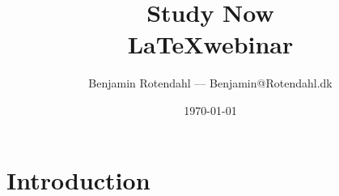 \documentclass{article}
\title{
  \vspace{13em}
  \large{Study Now} \\
  \Large{\LaTeX webinar} \\
}
\author{
  Benjamin Rotendahl --- Benjamin@Rotendahl.dk
}
\date{
  \vspace{22em}
  \today
}
\begin{document}
\clearpage

\maketitle		%
\thispagestyle{empty}
\newpage
\setcounter{page}{1}

\section{Introduction}
\end{document}
